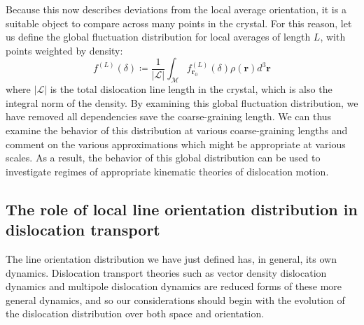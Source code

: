 Because this now describes deviations from the local average orientation, it is a suitable object to compare across many points in the crystal. For this reason, let us define the global fluctuation distribution for local averages of length \(L\), with points weighted by density:
\begin{equation}
f^{(L)}(\delta) \coloneqq \frac{1}{\left| \mathcal{L} \right|}\int_{\mathcal{M}}^{}{f_{\boldsymbol{r}_{0}}^{(L)}(\delta)\rho\left( \boldsymbol{r} \right)d^{3}\boldsymbol{r}} \label{eq:6globFDFdef}
\end{equation}
where \(\left| \mathcal{L} \right|\) is the total dislocation line length in the crystal, which is also the integral norm of the density. By examining this global fluctuation distribution, we have removed all dependencies save the coarse-graining length. We can thus examine the behavior of this distribution at various coarse-graining lengths and comment on the various approximations which might be appropriate at various scales. As a result, the behavior of this global distribution can be used to investigate regimes of appropriate kinematic theories of dislocation motion.

\subsection{The role of local line orientation distribution in dislocation transport}
The line orientation distribution we have just defined has, in general, its own dynamics. Dislocation transport theories such as vector density dislocation dynamics and multipole dislocation dynamics are reduced forms of these more general dynamics, and so our considerations should begin with the evolution of the dislocation distribution over both space and orientation.

